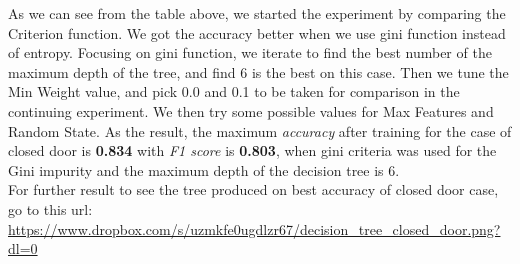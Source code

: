 \documentclass[conference]{IEEEtran}
\begin{document}
As we can see from the table above, we started the experiment by comparing the Criterion function. We got the accuracy better when we use gini function instead of entropy. Focusing on gini function, we iterate to find the best number of the maximum depth of the tree, and find 6 is the best on this case. Then we tune the Min Weight value, and pick 0.0 and 0.1 to be taken for comparison in the continuing experiment. We then try some possible values for Max Features and Random State. As the result, the maximum \textit{accuracy} after training for the case of closed door is \textbf{0.834} with \textit{F1 score} is \textbf{0.803}, when gini criteria was used for the Gini impurity and the maximum depth of the decision tree is 6. \\

For further result to see the tree produced on best accuracy of closed door case, go to this url: \url{https://www.dropbox.com/s/uzmkfe0ugdlzr67/decision_tree_closed_door.png?dl=0}
\end{document}
